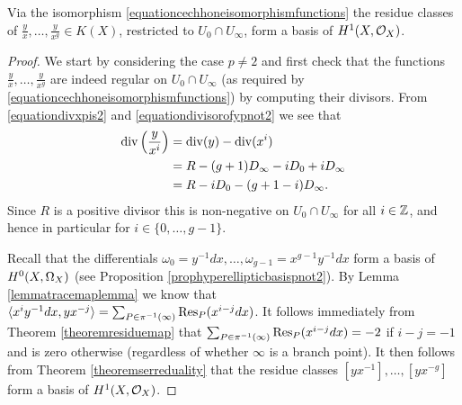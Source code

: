     \begin{thm}\label{theorembasisofhone}
     Via the isomorphism \eqref{equationcechhoneisomorphismfunctions} the residue classes of $\frac{y}{x}, \ldots , \frac{y}{x^g} \in K(X)$, restricted to $U_0 \cap U_\infty$, form a basis of $H^1(X,{\cal O}_X)$.
    \end{thm}
    \begin{proof}
    We start by considering the case $p \neq 2$ and first check that the functions $\frac{y}{x}, \ldots, \frac{y}{x^g}$ are indeed regular on $U_0 \cap U_\infty$ (as required by \eqref{equationcechhoneisomorphismfunctions}) by computing their divisors.
    From \eqref{equationdivxpis2} and \eqref{equationdivisorofypnot2} we see that
        \begin{equation*}\label{equationdivisorofyoverx}
        \begin{split}
        \operatorname{div} \left( \frac{y}{x^i} \right) & = \operatorname{div} (y) - \operatorname{div} ( x^i) \\
        & = R - (g+1)D_\infty - iD_0 + iD_\infty \\
        & = R - iD_0 - (g+1 - i)D_\infty.
        \end{split}
        \end{equation*}
    Since $R$ is a positive divisor this is non-negative on $U_0 \cap U_\infty$ for all $i \in {\mathbb Z}$, and hence in particular for $i\in \{0, \ldots, g-1\}$.
    
    
    Recall that the differentials $\omega_0 = y^{-1}dx, \ldots, \omega_{g-1} = x^{g-1}y^{-1}dx$ form a basis of ${H^0(X,\Omega_X)}$ (see Proposition \ref{prophyperellipticbasispnot2}).
    By Lemma \ref{lemmatracemaplemma} we know that $\langle x^iy^{-1}dx, yx^{-j} \rangle = \sum_{P \in \pi^{-1}(\infty)}\operatorname{Res}_P(x^{i-j}dx)$.
    It follows immediately from Theorem \ref{theoremresiduemap} that $\sum_{P \in \pi^{-1}(\infty)}\operatorname{Res}_P(x^{i-j}dx) = -2$ if $i-j=-1$ and is zero otherwise (regardless of whether $\infty$ is a branch point).
    It then follows from Theorem \ref{theoremserreduality} that the residue classes $\left[yx^{-1}\right],\ldots,\left[yx^{-g}\right]$ form a basis of $H^1(X,\mathcal{O}_X)$.
    

\end{proof}
